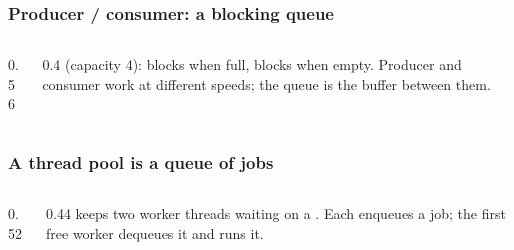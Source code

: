 \documentclass[aspectratio=169,10pt,compress]{beamer}
\begin{document}
\begin{frame}[t,fragile] \frametitle{Producer / consumer: a blocking queue}
  \begin{columns}[T]
    \begin{column}{0.56\textwidth}
    \end{column}
    \begin{column}{0.4\textwidth}
      \small
       (capacity 4):  blocks when full,
       blocks when empty. Producer and consumer work at different speeds;
      the queue is the buffer between them.
    \end{column}
  \end{columns}
\end{frame}




\begin{frame}[t,fragile] \frametitle{A thread pool is a queue of jobs}
  \begin{columns}[T]
    \begin{column}{0.52\textwidth}
    \end{column}
    \begin{column}{0.44\textwidth}
      \small
       keeps two worker threads waiting on a
      . Each  enqueues a job; the first
      free worker dequeues it and runs it.
    \end{column}
  \end{columns}
\end{frame}

\end{document}
